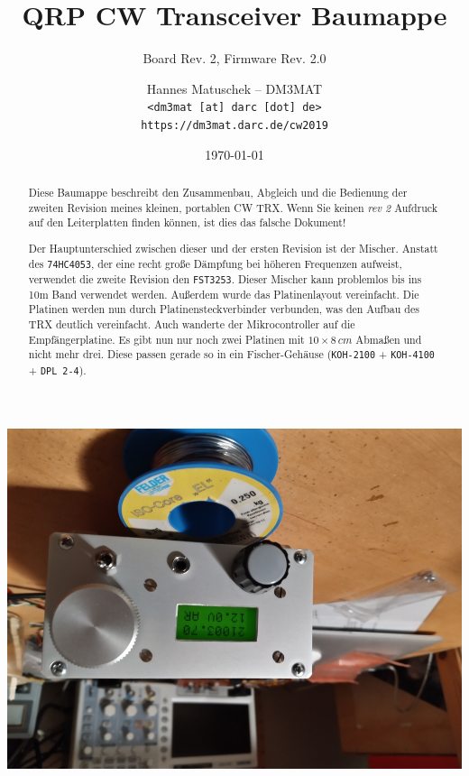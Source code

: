 \documentclass[10pt, a4paper,twoside]{scrartcl}
\title{QRP CW Transceiver Baumappe}
\subtitle{Board Rev. 2, Firmware Rev. 2.0}
\author{Hannes Matuschek -- DM3MAT\\\texttt{<dm3mat [at] darc [dot] de>}\\\texttt{https://dm3mat.darc.de/cw2019}}
\date{\today}
\begin{document}
\maketitle

\begin{abstract}
Diese Baumappe beschreibt den Zusammenbau, Abgleich und die Bedienung der zweiten Revision meines kleinen, portablen CW TRX. Wenn Sie keinen \emph{rev 2} Aufdruck auf den Leiterplatten finden können, ist dies das falsche Dokument!

Der Hauptunterschied zwischen dieser und der ersten Revision ist der Mischer. Anstatt des \texttt{74HC4053}, der eine recht große Dämpfung bei höheren Frequenzen aufweist, verwendet die zweite Revision den \texttt{FST3253}. Dieser Mischer kann problemlos bis ins 10m Band verwendet werden. Außerdem wurde das Platinenlayout vereinfacht. Die Platinen werden nun durch Platinensteckverbinder verbunden, was den Aufbau des TRX deutlich vereinfacht. Auch wanderte der Mikrocontroller auf die Empfängerplatine. Es gibt nun nur noch zwei Platinen mit $10\times 8\,cm$ Abmaßen und nicht mehr drei. Diese passen gerade so in ein Fischer-Gehäuse (\texttt{KOH-2100} + \texttt{KOH-4100} + \texttt{DPL 2-4}).
\end{abstract}
\thispagestyle{empty}
\vfill
\begin{center}
 \includegraphics[width=0.7\linewidth]{fig/complete_small.png}
\end{center}



\cleardoublepage
\tableofcontents
\thispagestyle{empty}

\cleardoublepage
\end{document}
